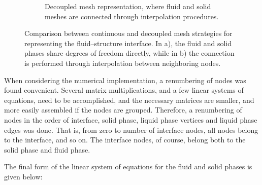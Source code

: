 \documentclass{article}
\begin{document}
\begin{figure}
\begin{subfigure}[t]{0.47\textwidth}
		\caption{Decoupled mesh representation, where fluid and solid meshes are connected through interpolation procedures.}
	\end{subfigure}
	\caption{Comparison between continuous and decoupled mesh strategies for representing the fluid--structure interface. In a), the fluid and solid phases share degrees of freedom directly, while in b) the connection is performed through interpolation between neighboring nodes.}
	\label{fig:mesh method}
\end{figure}

When considering the numerical implementation, a renumbering of nodes was found convenient. Several matrix multiplications, and a few linear systems of equations, need to be accomplished, and the necessary matrices are smaller, and more easily assembled if the nodes are grouped. Therefore, a renumbering of nodes in the order of interface, solid phase, liquid phase vertices and liquid phase edges was done. That is, from zero to number of interface nodes, all nodes belong to the interface, and so on. The interface nodes, of course, belong both to the solid phase and fluid phase.

The final form of the linear system of equations for the fluid and solid phases is given below: \\
\end{document}

